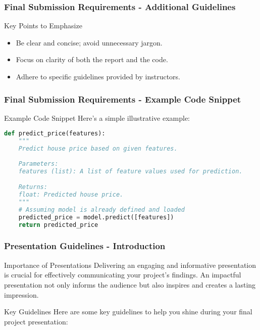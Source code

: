 \documentclass[aspectratio=169]{beamer}
\begin{document}
\begin{frame}[fragile]
    \frametitle{Final Submission Requirements - Additional Guidelines}
    \begin{block}{Key Points to Emphasize}
        \begin{itemize}
            \item Be clear and concise; avoid unnecessary jargon.
            \item Focus on clarity of both the report and the code.
            \item Adhere to specific guidelines provided by instructors.
        \end{itemize}
    \end{block}
\end{frame}

\begin{frame}[fragile]
    \frametitle{Final Submission Requirements - Example Code Snippet}
    \begin{block}{Example Code Snippet}
        Here’s a simple illustrative example:
        \begin{lstlisting}[language=Python]
def predict_price(features):
    """
    Predict house price based on given features.
    
    Parameters:
    features (list): A list of feature values used for prediction.

    Returns:
    float: Predicted house price.
    """
    # Assuming model is already defined and loaded
    predicted_price = model.predict([features])
    return predicted_price
        \end{lstlisting}
    \end{block}
\end{frame}

\begin{frame}[fragile]
    \frametitle{Presentation Guidelines - Introduction}
    \begin{block}{Importance of Presentations}
        Delivering an engaging and informative presentation is crucial for effectively communicating your project's findings. 
        An impactful presentation not only informs the audience but also inspires and creates a lasting impression.
    \end{block}
    \begin{block}{Key Guidelines}
        Here are some key guidelines to help you shine during your final project presentation:
    \end{block}
\end{frame}
\end{document}
